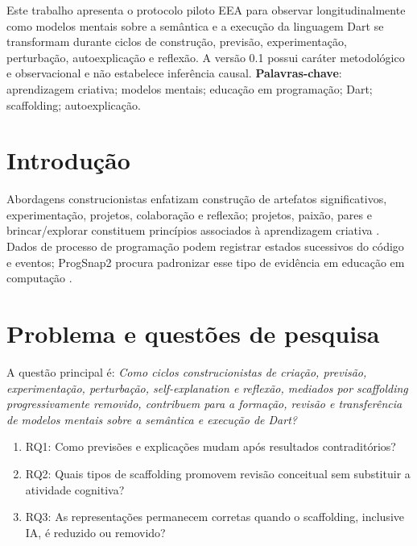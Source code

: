 \documentclass[12pt,oneside,a4paper,brazil]{abntex2}
\begin{document}
\maketitle
\begin{resumo}
Este trabalho apresenta o protocolo piloto EEA para observar longitudinalmente como modelos mentais sobre a semântica e a execução da linguagem Dart se transformam durante ciclos de construção, previsão, experimentação, perturbação, autoexplicação e reflexão. A versão 0.1 possui caráter metodológico e observacional e não estabelece inferência causal.
\textbf{Palavras-chave}: aprendizagem criativa; modelos mentais; educação em programação; Dart; scaffolding; autoexplicação.
\end{resumo}
\begin{abstract}
This paper presents the EEA pilot protocol for longitudinally observing how mental models of Dart semantics and execution change through cycles of construction, prediction, experimentation, perturbation, self-explanation, and reflection. Version 0.1 is methodological and observational and makes no causal claim.
\textbf{Keywords}: creative learning; mental models; programming education; Dart; scaffolding; self-explanation.
\end{abstract}
\section{Introdução}
Abordagens construcionistas enfatizam construção de artefatos significativos, experimentação, projetos, colaboração e reflexão; projetos, paixão, pares e brincar/explorar constituem princípios associados à aprendizagem criativa \cite{resnick2017}. Dados de processo de programação podem registrar estados sucessivos do código e eventos; ProgSnap2 procura padronizar esse tipo de evidência em educação em computação \cite{price2020}.
\section{Problema e questões de pesquisa}
A questão principal é: \textit{Como ciclos construcionistas de criação, previsão, experimentação, perturbação, self-explanation e reflexão, mediados por scaffolding progressivamente removido, contribuem para a formação, revisão e transferência de modelos mentais sobre a semântica e execução de Dart?}
\begin{enumerate}
\item RQ1: Como previsões e explicações mudam após resultados contraditórios?
\item RQ2: Quais tipos de scaffolding promovem revisão conceitual sem substituir a atividade cognitiva?
\item RQ3: As representações permanecem corretas quando o scaffolding, inclusive IA, é reduzido ou removido?
\end{enumerate}
\end{document}
